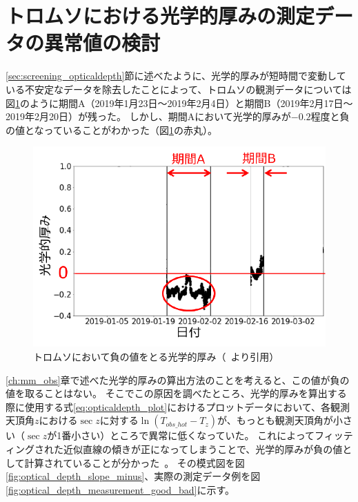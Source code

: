 \section{トロムソにおける光学的厚みの測定データの異常値の検討}
\label{sec:correction_opticaldepth}
\ref{sec:screening_opticaldepth}節に述べたように、光学的厚みが短時間で変動している不安定なデータを除去したことによって、トロムソの観測データについては図\ref{fig:optical_depth_minus}のように期間A（2019年1月23日〜2019年2月4日）と期間B（2019年2月17日〜2019年2月20日）が残った。
しかし、期間Aにおいて光学的厚みが$-0.2$程度と負の値となっていることがわかった（図\ref{fig:optical_depth_minus}の赤丸）。
\begin{figure}[htbp]
    \centering
    \includegraphics[width=\linewidth]{master_thesis_contents/master_thesis_fig/optical_depth_minus.pdf}
    \caption{トロムソにおいて負の値をとる光学的厚み（~\cite{goto2021bachelor}より引用）}
    \label{fig:optical_depth_minus}
\end{figure}
\ref{ch:mm_obs}章で述べた光学的厚みの算出方法のことを考えると、この値が負の値を取ることはない。
そこでこの原因を調べたところ、光学的厚みを算出する際に使用する式\eqref{eq:opticaldepth_plot}におけるプロットデータにおいて、各観測天頂角$z$における$\sec z$に対する$\ln \left( T_{obs\_ hot} - T_z \right)$が、もっとも観測天頂角が小さい（$\sec z$が1番小さい）ところで異常に低くなっていた。
これによってフィッティングされた近似直線の傾きが正になってしまうことで、光学的厚みが負の値として計算されていることが分かった~\cite{goto2021bachelor}。
その模式図を図\ref{fig:optical_depth_slope_minus}、実際の測定データ例を図\ref{fig:optical_depth_measurement_good_bad}に示す。\par

